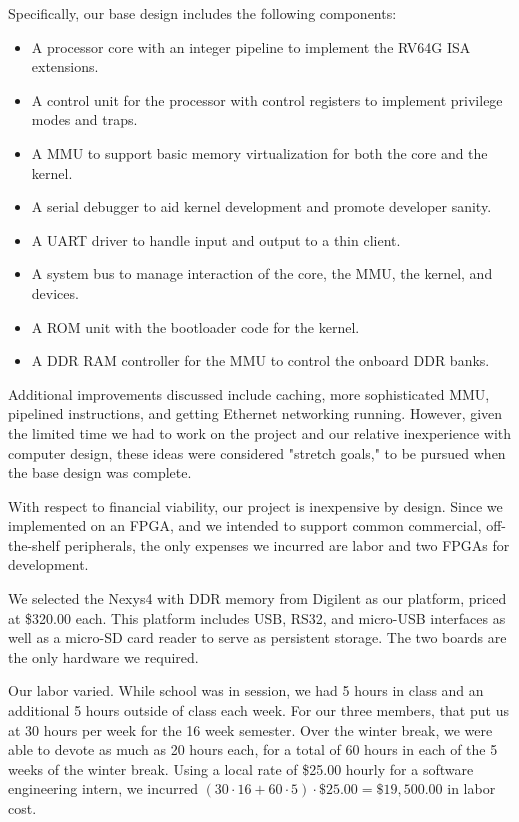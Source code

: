 \documentclass{article}
\begin{document}
Specifically, our base design includes the following components:
\begin{itemize}
    \item A processor core with an integer pipeline to implement the RV64G ISA extensions.
    \item A control unit for the processor with control registers to implement privilege modes and traps.
    \item A MMU to support basic memory virtualization for both the core and the kernel.
    \item A serial debugger to aid kernel development and promote developer sanity.
    \item A UART driver to handle input and output to a thin client.
    \item A system bus to manage interaction of the core, the MMU, the kernel, and devices.
    \item A ROM unit with the bootloader code for the kernel.
    \item A DDR RAM controller for the MMU to control the onboard DDR banks.
\end{itemize}

Additional improvements discussed include caching, more sophisticated MMU, pipelined instructions, and getting Ethernet networking running.  However, given the limited time we had to work on the project and our relative inexperience with computer design, these ideas were considered "stretch goals," to be pursued when the base design was complete.

With respect to financial viability, our project is inexpensive by design.  Since we implemented on an FPGA, and we intended to support common commercial, off-the-shelf peripherals, the only expenses we incurred are labor and two FPGAs for development.  

We selected the Nexys4 with DDR memory from Digilent as our platform, priced at \$320.00 each.  This platform includes USB, RS32, and micro-USB interfaces as well as a micro-SD card reader to serve as persistent storage.  The two boards are the only hardware we required.

Our labor varied.  While school was in session, we had 5 hours in class and an additional 5 hours outside of class each week.  For our three members, that put us at 30 hours per week for the 16 week semester.  Over the winter break, we were able to devote as much as 20 hours each, for a total of 60 hours in each of the 5 weeks of the winter break.  Using a local rate of \$25.00 hourly for a software engineering intern, we incurred $(30\cdot 16 + 60\cdot 5)\cdot \$25.00 = \$19,500.00$ in labor cost.
\end{document}
